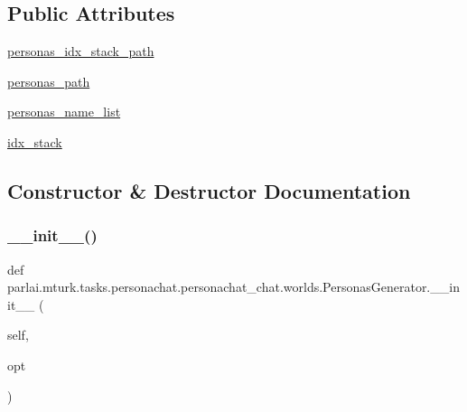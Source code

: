\subsection*{Public Attributes}
\begin{DoxyCompactItemize}
\item 
\hyperlink{classparlai_1_1mturk_1_1tasks_1_1personachat_1_1personachat__chat_1_1worlds_1_1PersonasGenerator_ac13e6005f73e2172b1e188bf7aa3debf}{personas\+\_\+idx\+\_\+stack\+\_\+path}
\item 
\hyperlink{classparlai_1_1mturk_1_1tasks_1_1personachat_1_1personachat__chat_1_1worlds_1_1PersonasGenerator_a8fca2a7dc0bf0414a2e46024de75882b}{personas\+\_\+path}
\item 
\hyperlink{classparlai_1_1mturk_1_1tasks_1_1personachat_1_1personachat__chat_1_1worlds_1_1PersonasGenerator_ac31580ffc80d96ba4a04480e1961fdde}{personas\+\_\+name\+\_\+list}
\item 
\hyperlink{classparlai_1_1mturk_1_1tasks_1_1personachat_1_1personachat__chat_1_1worlds_1_1PersonasGenerator_a608c0f26f6e8ca388ce2e336068fae51}{idx\+\_\+stack}
\end{DoxyCompactItemize}


\subsection{Constructor \& Destructor Documentation}
\mbox{\label{classparlai_1_1mturk_1_1tasks_1_1personachat_1_1personachat__chat_1_1worlds_1_1PersonasGenerator_a5d28818c8d8f07d9f0fa0fdac8a9f516}} 
\subsubsection{\texorpdfstring{\+\_\+\+\_\+init\+\_\+\+\_\+()}{\_\_init\_\_()}}
{\footnotesize\ttfamily def parlai.\+mturk.\+tasks.\+personachat.\+personachat\+\_\+chat.\+worlds.\+Personas\+Generator.\+\_\+\+\_\+init\+\_\+\+\_\+ (\begin{DoxyParamCaption}\item[{}]{self,  }\item[{}]{opt }\end{DoxyParamCaption})}



